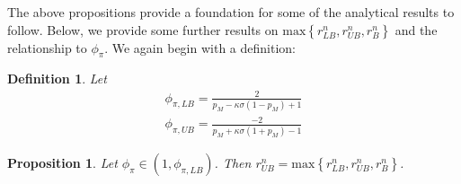 \documentclass[11pt]{article}
\newtheorem{definition}{Definition}
\newtheorem{proposition}{Proposition}
\begin{document}
	The above propositions provide a foundation for some of the analytical results to follow. Below, we provide some further results on $\text{max}\left\{r^n_{LB}, r^n_{UB}, r^n_{B}\right\}$ and the relationship to $\phi_{\pi}$. We again begin with a definition:
	\begin{definition}
		Let
		\begin{align*}
			\phi_{\pi,LB} = \frac{2}{p_M - \kappa\sigma(1-p_M) + 1}\\
			\phi_{\pi,UB} = \frac{-2}{p_M + \kappa\sigma(1+p_M) - 1}
		\end{align*}
	\end{definition}
	\begin{proposition}\label{prop:cPHIpiub}
		Let $\phi_{\pi}\in(1,\phi_{\pi,LB})$. Then $r^n_{UB} = \text{max}\left\{r^n_{LB}, r^n_{UB}, r^n_{B}\right\}$. 
	\end{proposition}
\end{document}
